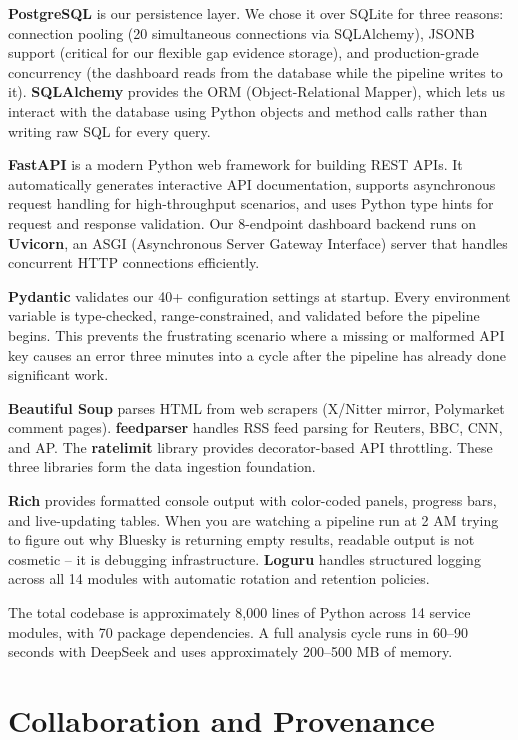 \documentclass[conference]{IEEEtran}
\begin{document}
\textbf{PostgreSQL} is our persistence layer. We chose it over SQLite for three reasons: connection pooling (20 simultaneous connections via SQLAlchemy), JSONB support (critical for our flexible gap evidence storage), and production-grade concurrency (the dashboard reads from the database while the pipeline writes to it). \textbf{SQLAlchemy} provides the ORM (Object-Relational Mapper), which lets us interact with the database using Python objects and method calls rather than writing raw SQL for every query.

\textbf{FastAPI} is a modern Python web framework for building REST APIs. It automatically generates interactive API documentation, supports asynchronous request handling for high-throughput scenarios, and uses Python type hints for request and response validation. Our 8-endpoint dashboard backend runs on \textbf{Uvicorn}, an ASGI (Asynchronous Server Gateway Interface) server that handles concurrent HTTP connections efficiently.

\textbf{Pydantic} validates our 40+ configuration settings at startup. Every environment variable is type-checked, range-constrained, and validated before the pipeline begins. This prevents the frustrating scenario where a missing or malformed API key causes an error three minutes into a cycle after the pipeline has already done significant work.

\textbf{Beautiful Soup} parses HTML from web scrapers (X/Nitter mirror, Polymarket comment pages). \textbf{feedparser} handles RSS feed parsing for Reuters, BBC, CNN, and AP. The \textbf{ratelimit} library provides decorator-based API throttling. These three libraries form the data ingestion foundation.

\textbf{Rich} provides formatted console output with color-coded panels, progress bars, and live-updating tables. When you are watching a pipeline run at 2 AM trying to figure out why Bluesky is returning empty results, readable output is not cosmetic -- it is debugging infrastructure. \textbf{Loguru} handles structured logging across all 14 modules with automatic rotation and retention policies.

The total codebase is approximately 8,000 lines of Python across 14 service modules, with 70 package dependencies. A full analysis cycle runs in 60--90 seconds with DeepSeek and uses approximately 200--500 MB of memory.

\section{Collaboration and Provenance}
\end{document}
